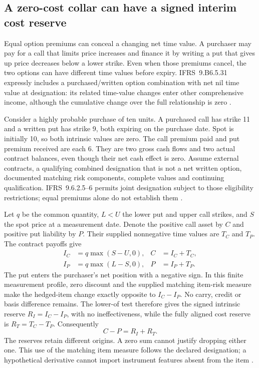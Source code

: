 \subsection{A zero-cost collar can have a signed interim cost reserve}
\label{aligned-zero-cost-collar}

Equal option premiums can conceal a changing net time value. A purchaser may
pay for a call that limits price increases and finance it by writing a put that
gives up price decreases below a lower strike. Even when those premiums cancel,
the two options can have different time values before expiry. IFRS~9.B6.5.31
expressly includes a purchased/written option combination with net nil time
value at designation: its related time-value changes enter other comprehensive
income, although the cumulative change over the full relationship is zero
\citep[IFRS~9.B6.5.31--32]{eu20231803}.

Consider a highly probable purchase of ten units. A purchased call has strike
11 and a written put has strike 9, both expiring on the purchase date. Spot is
initially 10, so both intrinsic values are zero. The call premium paid and put
premium received are each 6. They are two gross cash flows and two actual
contract balances, even though their net cash effect is zero. Assume external
contracts, a qualifying combined designation that is not a net written option,
documented matching risk components, complete values and continuing
qualification. IFRS~9.6.2.5--6 permits joint designation subject to those
eligibility restrictions; equal premiums alone do not establish them
\citep[IFRS~9.6.2.1--6, 6.3.7, 6.4.1]{eu20231803}.

Let \(q\) be the common quantity, \(L<U\) the lower put and upper call
strikes, and \(S\) the spot price at a measurement date. Denote the positive
call asset by \(C\) and positive put liability by \(P\). Their supplied
nonnegative time values are \(T_C\) and \(T_P\). The contract payoffs give
\[
 \begin{aligned}
 I_C&=q\max(S-U,0),& C&=I_C+T_C,\\
 I_P&=q\max(L-S,0),& P&=I_P+T_P.
 \end{aligned}
\]
The put enters the purchaser's net position with a negative sign. In this
finite measurement profile, zero discount and the supplied matching item-risk
measure make the hedged-item change exactly opposite to \(I_C-I_P\).
No carry, credit or basis difference remains. The lower-of test therefore gives
the signed intrinsic reserve \(R_I=I_C-I_P\), with no ineffectiveness, while
the fully aligned cost reserve is \(R_T=T_C-T_P\). Consequently
\[
 C-P=R_I+R_T.
\]
The reserves retain different origins. A zero sum cannot justify dropping
either one. This use of the matching item measure follows the declared
designation; a hypothetical derivative cannot import instrument features
absent from the item \citep[IFRS~9.6.5.11, B6.5.5]{eu20231803}.


